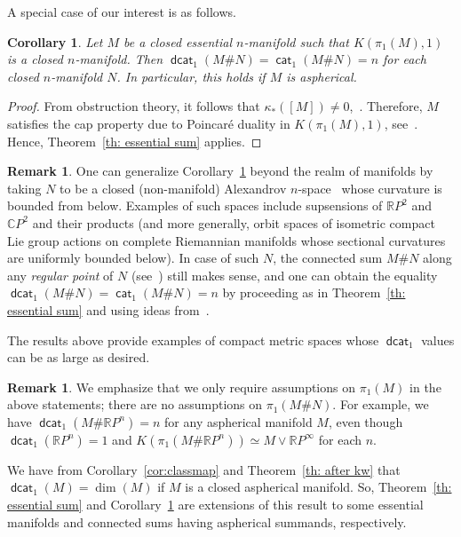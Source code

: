 \documentclass[amscd,amssymb,verbatim,11pt]{amsart}
\theoremstyle{plain}
\newtheorem{corollary}[thm]{Corollary}
\theoremstyle{definition}
\newtheorem{remark}[thm]{Remark}
\DeclareMathOperator{\cat}{{\mathsf{cat}}}
\DeclareMathOperator{\dcat}{{\mathsf{dcat}}}
\def\C{{\mathbb C}}
\def\R{{\mathbb R}}
\begin{document}
A special case of our interest is as follows.

\begin{corollary}\label{cor: essential sum1}
Let $M$ be a closed essential $n$-manifold such that $K(\pi_1(M),1)$ is a closed $n$-manifold. Then $\dcat_1(M \# N) = \cat_1(M\# N) = n$ for each closed $n$-manifold $N$. In particular, this holds if $M$ is aspherical.
\end{corollary}
\begin{proof}
    From obstruction theory, it follows that $\kappa_*([M])\ne 0$,~\cite[Theorem 8.2]{Ba}. Therefore, $M$ satisfies the cap property due to Poincaré duality in $K(\pi_1(M),1)$, see~\cite[Corollary 3.4]{Ja2}. Hence, Theorem~\ref{th: essential sum} applies.
\end{proof}

\begin{remark}\label{Alex}
    One can generalize Corollary~\ref{cor: essential sum1} beyond the realm of manifolds by taking $N$ to be a closed (non-manifold) Alexandrov $n$-space~\cite{BGP} whose curvature is bounded from below. Examples of such spaces include supsensions of $\R P^2$ and $\C P^2$ and their products (and more generally, orbit spaces of isometric compact Lie group actions on complete Riemannian manifolds whose sectional curvatures are uniformly bounded below). In case of such $N$, the connected sum $M\# N$ along any \emph{regular point} of $N$ (see~\cite{BGP,decomposition}) still makes sense, and one can obtain the equality $\dcat_1(M\#N)=\cat_1(M\#N)=n$ by proceeding as in Theorem~\ref{th: essential sum} and using ideas from~\cite[Section 7]{Ja2}.
\end{remark}

The results above provide examples of compact metric spaces whose $\dcat_1$ values can be as large as desired.


\begin{remark}\label{rmk:sum with rpn}
    We emphasize that we only require assumptions on $\pi_1(M)$ in the above statements; there are no assumptions on $\pi_1(M\#N)$. For example, we have $\dcat_1(M\# \R P^n)=n$ for any aspherical manifold $M$, even though $\dcat_1(\R P^n)=1$ and $K(\pi_1(M\#\R P^n))\simeq M\vee \R P^{\infty}$ for each $n$.
\end{remark}

We have from Corollary~\ref{cor:classmap} and Theorem~\ref{th: after kw} that $\dcat_1(M)=\dim(M)$ if $M$ is a closed aspherical manifold. So, Theorem~\ref{th: essential sum} and Corollary~\ref{cor: essential sum1} are extensions of this result to some essential manifolds and connected sums having aspherical summands, respectively.
\end{document}
